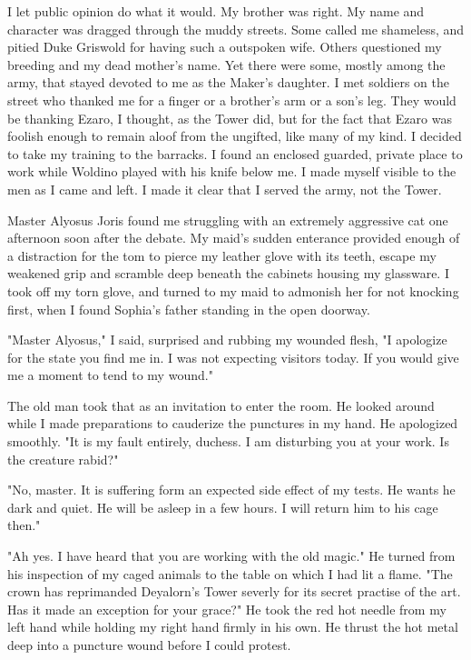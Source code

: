 \documentclass{article}
\begin{document}
I let public opinion do what it would. My brother was right. My name and character was dragged through the muddy streets. Some called me shameless, and pitied Duke Griswold for having such a outspoken wife. Others questioned my breeding and my dead mother's name. Yet there were some, mostly among the army, that stayed devoted to me as the Maker's daughter. I met soldiers on the street who thanked me for a finger or a brother's arm or a son's leg. They would be thanking Ezaro, I thought, as the Tower did, but for the fact that Ezaro was foolish enough to remain aloof from the ungifted, like many of my kind. I decided to take my training to the barracks. I found an enclosed guarded, private place to work while Woldino played with his knife below me. I made myself visible to the men as I came and left. I made it clear that I served the army, not the Tower. 

Master Alyosus Joris found me struggling with an extremely aggressive cat one afternoon soon after the debate. My maid's sudden enterance provided enough of a distraction for the tom to pierce my leather glove with its teeth, escape my weakened grip and scramble deep beneath the cabinets housing my glassware. I took off my torn glove, and turned to my maid to admonish her for not knocking first, when I found Sophia's father standing in the open doorway. 

"Master Alyosus," I said, surprised and rubbing my wounded flesh, "I apologize for the state you find me in. I was not expecting visitors today. If you would give me a moment to tend to my wound."

The old man took that as an invitation to enter the room. He looked around while I made preparations to cauderize the punctures in my hand. He apologized smoothly. "It is my fault entirely, duchess. I am disturbing you at your work. Is the creature rabid?" 

"No, master. It is suffering form an expected side effect of my tests. He wants he dark and quiet. He will be asleep in a few hours. I will return him to his cage then."

"Ah yes. I have heard that you are working with the old magic." He turned from his inspection of my caged animals to the table on which I had lit a flame. "The crown has reprimanded Deyalorn's Tower severly for its secret practise of the art. Has it made an exception for your grace?" He took the red hot needle from my left hand while holding my right hand firmly in his own. He thrust the hot metal deep into a puncture wound before I could protest.
\end{document}
